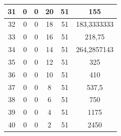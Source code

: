 \begin{table}[]
\begin{tabular}{|c|c|c|c|c|c|}
 			31                                           & 0                      & 0                     & 20                    & 51                     & 155                                                \\ \hline
 			32                                           & 0                      & 0                     & 18                    & 51                     & 183,3333333                                        \\ \hline
 			33                                           & 0                      & 0                     & 16                    & 51                     & 218,75                                             \\ \hline
 			34                                           & 0                      & 0                     & 14                    & 51                     & 264,2857143                                        \\ \hline
 			35                                           & 0                      & 0                     & 12                    & 51                     & 325                                                \\ \hline
 			36                                           & 0                      & 0                     & 10                    & 51                     & 410                                                \\ \hline
 			37                                           & 0                      & 0                     & 8                     & 51                     & 537,5                                              \\ \hline
 			38                                           & 0                      & 0                     & 6                     & 51                     & 750                                                \\ \hline
 			39                                           & 0                      & 0                     & 4                     & 51                     & 1175                                               \\ \hline
 			40                                           & 0                      & 0                     & 2                     & 51                     & 2450                                               \\ \hline
 		\end{tabular}
 \end{table} 
